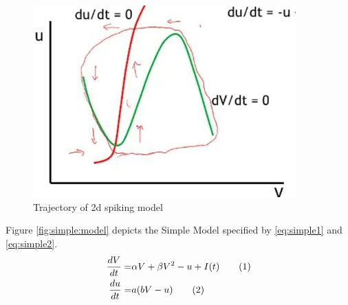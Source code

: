 \documentclass[]{article}
\newcommand\numberthis{\addtocounter{equation}{1}\tag{\theequation}}
\begin{document}
\begin{figure}[H]
	\caption[Trajectory of 2d spiking  model]{Trajectory of  2d spiking model}
	\includegraphics[width=0.9\textwidth]{2d-spike}
\end{figure}

Figure \ref{fig:simple:model} depicts the  Simple Model \cite{izhikevich2003simple} specified by \eqref{eq:simple1} and \eqref{eq:simple2}.
\begin{align*}
	\frac{dV}{dt} =& \alpha V + \beta V^2 - u +I(t)\numberthis \label{eq:simple1}\\
	\frac{du}{dt} =& a(bV-u)\numberthis \label{eq:simple2}
\end{align*}
\end{document}
